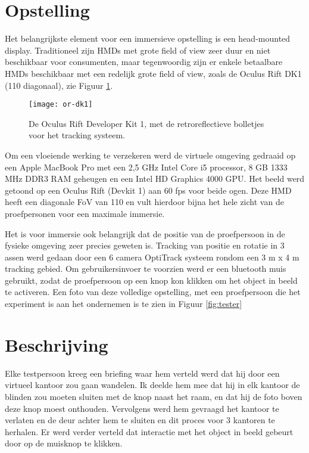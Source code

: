 \section{Opstelling}
Het belangrijkste element voor een immersieve opstelling is een head-mounted
display. Traditioneel zijn HMDs met grote field of view zeer duur en niet 
beschikbaar voor consumenten, maar tegenwoordig zijn er enkele betaalbare HMDs 
beschikbaar met een redelijk grote field of view, zoals de Oculus Rift DK1 
(110\textdegree{} diagonaal), zie Figuur \ref{fig:or-dk1}.

\begin{figure}[b!]
    \centering
    \texttt{[image: or-dk1]}
    \caption{De Oculus Rift Developer Kit 1, met de retroreflectieve bolletjes
    voor het tracking systeem.}
    \label{fig:or-dk1}
\end{figure}

Om een vloeiende werking te verzekeren werd de virtuele omgeving gedraaid op een
Apple MacBook Pro met een 2,5 GHz Intel Core i5 processor, 8 GB 1333 MHz DDR3 RAM
geheugen en een Intel HD Graphics 4000 GPU. Het beeld werd getoond op een Oculus 
Rift (Devkit 1) aan 60 fps voor beide ogen. Deze HMD heeft een diagonale FoV van 
110\textdegree{} en vult hierdoor bijna het hele zicht van de proefpersonen voor 
een maximale immersie.

Het is voor immersie ook belangrijk dat de positie van de proefpersoon in de 
fysieke omgeving zeer precies geweten is. Tracking van positie en rotatie in 3 
assen werd gedaan door een 6 camera OptiTrack systeem rondom een 3 m x 4 m 
tracking gebied. Om gebruikersinvoer te voorzien werd er een bluetooth muis 
gebruikt, zodat de proefpersoon op een knop kon klikken om het object in beeld te
activeren. Een foto van deze volledige opstelling, met een proefpersoon die het
experiment is aan het ondernemen is te zien in Figuur \ref{fig:tester}


\section{Beschrijving}
Elke testpersoon kreeg een briefing waar hem verteld werd dat hij door een 
virtueel kantoor zou gaan wandelen. Ik deelde hem mee dat hij in elk kantoor de 
blinden zou moeten sluiten met de knop naast het raam, en dat hij de foto boven 
deze knop moest onthouden. Vervolgens werd hem gevraagd het kantoor te verlaten 
en de deur achter hem te sluiten en dit proces voor 3 kantoren te herhalen. Er
werd verder verteld dat interactie met het object in beeld gebeurt door op de
muisknop te klikken.

